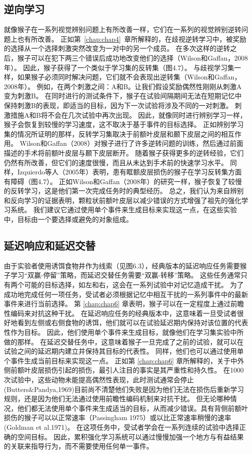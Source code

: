 \subsection{逆向学习}


就像猴子在一系列视觉辨别问题上有所改善一样，它们在一系列的视觉辨别逆转问题上也有所改善。
正如第~\ref{chap:chap4}~章所解释的，在歧视逆转学习中，被奖励的选择从一个选择刺激突然改变为一对中的另一个成员。
在多次这样的逆转之后，猴子可以在犯下两三个错误后成功地改变他们的选择（Wilson和Gaffan，2008年）。
因此，猴子获得了一个类似于学习集的反转集（图4.7）。
与歧视学习集一样，如果猴子必须同时解决问题，它们就不会表现出逆转集（Wilson和Gaffan，2008年）。
例如，在两个刺激之间：A和B。让我们假设奖励偶然性刚刚从刺激A变为刺激B。
在同时进行的测试条件下，猴子在试验间隔期间无法在短期记忆中保持刺激B的表现，即适当的目标，因为下一次试验将涉及不同的一对刺激。
刺激措施A和B将不会在几次试验中再次出现。
因此，就像同时进行辨别学习一样，猴子会恢复到较慢的学习速度，这不取决于基于事件的目标选择。
正如辨别学习集的情况所证明的那样，反转学习集取决于前额叶皮层和颞下皮层之间的相互作用。
Wilson和Gaffan（2008）对猴子进行了许多逆转问题的训练，然后通过前面描述的手术将前额叶皮层与颞下皮层断开。
随着猴子获得更多的逆转经验，它们仍然有所改善，但它们的速度很慢，而且从未达到手术前的快速学习水平。
同样，Izquierdo等人（2005年）表明，患有眶额皮层损伤的猴子在学习反转集方面有障碍（图4.7）。
正如Wilson和Gaffan（2008年）的研究一样，猴子恢复了较慢的反转学习，这是他们第一次完成任务时的典型经历。
总之，我们认为来自辨别和反向学习的证据表明，颗粒状前额叶皮层以减少错误的方式增强了祖先的强化学习系统。
我们建议它通过使用单个事件来生成目标来实现这一点，在这些实验中，目标由一个要选择或避免的对象组成。


\subsection{延迟响应和延迟交替}


由于实验者使用诱饵食物井作为线索（见图6.3），经典版本的延迟响应任务需要猴子学习“双赢-停留”策略，而延迟交替任务需要“双赢-转移”策略。
这些任务通常只有两个可能的目标选择，如左和右，这会在一系列试验中对记忆造成干扰。
为了成功地完成任何一项任务，受试者必须根据记忆中相互干扰的一系列事件中的最新事件来进行当前选择。
第 \ref{chap:chap6} 章表明，猴子可以在一定程度上通过前瞻性编码来对抗这种干扰。
在延迟响应任务的经典版本中，这意味着一旦受试者很好地看到左侧或右侧食物的诱饵，他们就可以在试验延迟期内保持对该位置的代表性作为目标。
因此，他们使用单个事件来生成目标，就像他们在学习集实验中所做的那样。
在延迟交替任务中，这意味着猴子一旦完成了之前的试验，就可以在试验之间的延迟期内建立并保持其目标的代表性。
同样，他们也可以通过使用单个事件生成当前目标来实现这一点。
正如第 \ref{chap:chap6} 章所解释的，关于中外侧前额叶皮层损伤引起的损伤，最引人注目的事实是其严重性和持久性。
在1000次试验中，这些动物未能提高偶然性表现，此时测试通常会停止(Butters\&Pandya,1969)目前尚不清楚他们失败是因为他们无法在损伤后重新学习规则，还是因为他们无法通过使用前瞻性编码机制来对抗干扰。
但无论哪种情况，他们都无法使用单个事件来生成适当的目标，从而减少错误。具有背侧前额叶损伤的猴子可以以正常速率（Passingham 1975）或以比正常速率稍慢的速率(Goldman et al.1971)。
在这项任务中，受试者学会在一系列连续的试验中选择正确的空间目标。
因此，累积强化学习系统可以通过慢慢加强一个地方与有益结果的关联来指导行为，而不需要使用任何单一事件。



